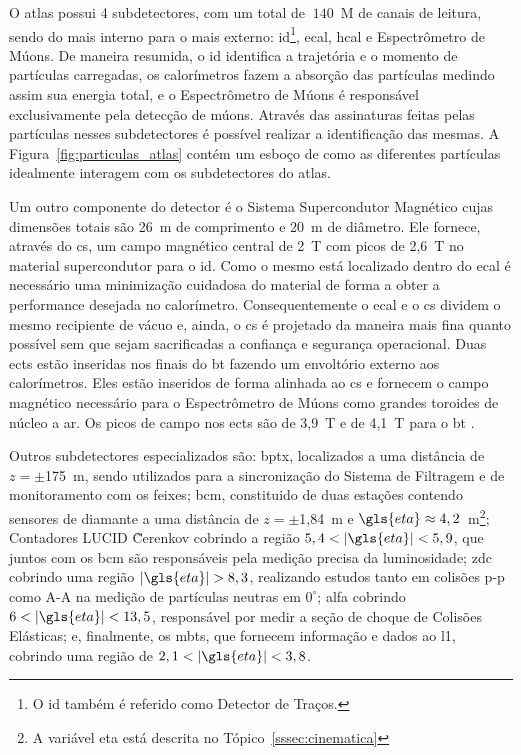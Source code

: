 O \gls{atlas} possui 4 subdetectores, com um total de $~140$~M de canais de
leitura, sendo do mais interno para o mais externo: 
\gls{id}\footnote{O \gls{id} também é referido como Detector de Traços.}, \gls{ecal}, 
\gls{hcal} e Espectrômetro de Múons. De maneira resumida, o \gls{id} identifica a
trajetória e o momento de partículas carregadas, os calorímetros fazem a
absorção das partículas medindo assim sua energia total, e o Espectrômetro de
Múons é responsável exclusivamente pela detecção de múons.
Através das assinaturas feitas pelas partículas nesses 
subdetectores é possível realizar a identificação das mesmas. 
A Figura~\ref{fig:particulas_atlas} contém um esboço de como as diferentes 
partículas idealmente interagem com os subdetectores do \gls{atlas}. 

Um outro componente do detector é o Sistema Supercondutor Magnético cujas
dimensões totais são 26~m de comprimento e 20~m de diâmetro. 
Ele fornece, através do \gls{cs}, um campo magnético central de 2~T com picos de 2,6~T 
no material supercondutor para o \gls{id}. Como o mesmo está
localizado dentro do \gls{ecal} é necessário uma minimização cuidadosa do
material de forma a obter a performance desejada no calorímetro. 
Consequentemente o \gls{ecal} e o \gls{cs} dividem o mesmo recipiente de vácuo e,
ainda, o \gls{cs} é projetado da maneira mais fina quanto possível sem que sejam
sacrificadas a confiança e segurança operacional.
Duas \glspl{ect} estão inseridas nos finais do \gls{bt} fazendo um
envoltório externo aos calorímetros. Eles estão inseridos de forma alinhada ao \gls{cs} 
e fornecem o campo magnético necessário para o Espectrômetro de Múons como grandes toroides 
de núcleo a ar. Os picos de campo nos \glspl{ect} são de
3,9~T e de 4,1~T para o \gls{bt} \cite{ATLAS_TDR}.

Outros subdetectores especializados são: \gls{bptx}, localizados a uma distância
de $z = \pm$175~m, sendo utilizados para a sincronização do Sistema de Filtragem e de 
monitoramento com os feixes; \gls{bcm}, constituido de duas estações contendo
sensores de diamante a uma distância de $z = \pm$1,84~m e $\gls{eta} \approx
4,2$~m\footnote{A variável \gls{eta} está descrita no Tópico~\ref{sssec:cinematica}}; 
Contadores LUCID \~Cerenkov cobrindo a região $5,4 < |\gls{eta}| < 5,9$, que
juntos com os \gls{bcm} são responsáveis pela medição precisa da luminosidade;
\gls{zdc} cobrindo uma região $|\gls{eta}|>8,3$, realizando estudos tanto em
colisões p-p como A-A na medição de partículas neutras em $0^{\circ}$;
\gls{alfa} cobrindo $6<|\gls{eta}|<13,5$, responsável por medir a seção de
choque de Colisões Elásticas; e, finalmente, os \gls{mbts}, que fornecem
informação e dados ao \glsdesc{l1}, cobrindo uma região de $2,1
< |\gls{eta}| < 3,8$.

